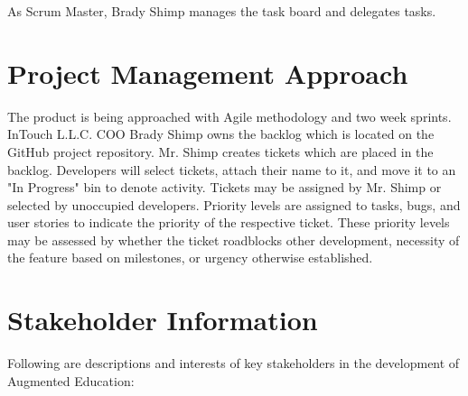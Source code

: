 As Scrum Master, Brady Shimp manages the task board and delegates tasks. 

\section{Project  Management Approach}

The product is being approached with Agile methodology and two week sprints. InTouch L.L.C. COO Brady Shimp owns the backlog which is located on the GitHub project repository. Mr. Shimp creates tickets which are placed in the backlog. Developers will select tickets, attach their name to it, and move it to an "In Progress" bin to denote activity. Tickets may be assigned by Mr. Shimp or selected by unoccupied developers. Priority levels are assigned to tasks, bugs, and user stories to indicate the priority of the respective ticket. These priority levels may be assessed by whether the ticket roadblocks other development, necessity of the feature based on milestones, or urgency otherwise established.

\section{ Stakeholder Information}



Following are descriptions and interests of key stakeholders in the development of Augmented Education:

